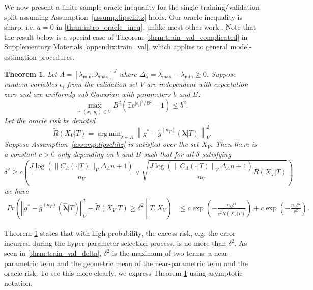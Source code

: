 \documentclass[12pt]{article} %
\newtheorem{theorem}{Theorem}
\theoremstyle{definition}
\DeclareMathOperator*{\argmin}{arg\,min}
\begin{document}
We now present a finite-sample oracle inequality for the single training/validation split assuming Assumption~\ref{assump:lipschitz} holds.
Our oracle inequality is sharp, i.e. $a=0$ in \eqref{thrm:intro_oracle_ineq}, unlike most other work \citep{gyorfi2006distribution, lecue2012oracle, van2003unified}.
Note that the result below is a special case of Theorem \ref{thrm:train_val_complicated} in Supplementary Materials \ref{appendix:train_val}, which applies to general model-estimation procedures.
\begin{theorem}
	\label{thrm:train_val}
	Let $\Lambda=[\lambda_{\min},\lambda_{\max}]^{J}$ where $\Delta_{\lambda} = \lambda_{\max} - \lambda_{\min} \ge 0$.
	Suppose random variables $\epsilon_i$ from the validation set $V$ are independent with expectation zero and are uniformly sub-Gaussian with parameters $b$ and $B$:
	$$
	\max_{i: (x_i, y_i) \in V} B^2 \left ( \mathbb{E} e^{|\epsilon_i|^2/B^2} - 1 \right ) \le b^2.
	$$
	Let the oracle risk be denoted
	\begin{equation}
	\tilde{R}(X_V|T) = \argmin_{\lambda \in \Lambda} \left \| g^*-\hat{g}^{(n_T)}( \boldsymbol{\lambda} | T) \right \|_{V}^{2}.
	\label{eq:tilde_lambda_def}
	\end{equation}
	Suppose Assumption~\ref{assump:lipschitz} is satisfied over the set $X_V$.
	Then there is a constant $c>0$ only depending on $b$ and $B$ such that for all $\delta$ satisfying
	\begin{equation}
	\delta^{2}
	\ge
	c \left (
	\frac{J \log(\|C_\Lambda(\cdot |T)\|_V \Delta_{\Lambda} n + 1)}{n_{V}}
	\vee 
	\sqrt{\frac{J \log(\|C_\Lambda(\cdot |T)\|_V \Delta_{\Lambda} n + 1)}{n_{V}}
		\tilde{R}(X_V|T)}
	\right )
	\label{thrm:train_val_delta}
	\end{equation}
	we have
	\begin{align}
	Pr\left(
	\left\Vert g^* - \hat{g}^{(n_T)}( \hat{\boldsymbol{\lambda}} | T) \right\Vert _{V}^2 -
	\tilde{R}(X_V|T)
	\ge\delta^2
	\middle | 
	T, X_V
	\right )
	&\le c\exp\left(-\frac{n_{V}\delta^{4}}{c^{2} \tilde{R}(X_V|T)}\right)
	+ c\exp\left(-\frac{n_{V}\delta^{2}}{c^{2}}\right).
	\end{align}
	
\end{theorem}
\noindent
Theorem \ref{thrm:train_val} states that with high probability, the excess risk, e.g. the error incurred during the hyper-parameter selection process, is no more than $\delta^2$.
As seen in \eqref{thrm:train_val_delta}, $\delta^2$ is the maximum of two terms: a near-parametric term and the geometric mean of the near-parametric term and the oracle risk. To see this more clearly, we express Theorem \ref{thrm:train_val} using asymptotic notation.
\end{document}
